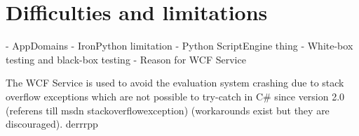 \section{Difficulties and limitations}
- AppDomains
- IronPython limitation
- Python ScriptEngine thing
- White-box testing and black-box testing
- Reason for WCF Service


The WCF Service is used to avoid the evaluation system crashing due to stack overflow exceptions which are not possible to try-catch in C\# since version 2.0 (referens  till msdn stackoverflowexception) (workarounds exist but they are discouraged). derrrpp